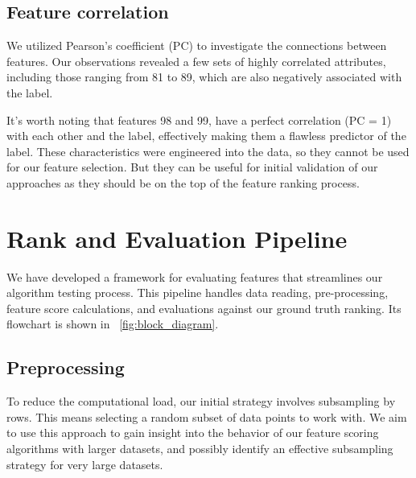 \documentclass[fleqn,moreauthors,10pt]{ds_report}
\begin{document}
\subsection*{Feature correlation}
We utilized Pearson's coefficient (PC) to investigate the connections between features. Our observations revealed a few sets of highly correlated attributes, including those ranging from 81 to 89, which are also negatively associated with the label.

It's worth noting that features 98 and 99, have a perfect correlation (PC = 1) with each other and the label, effectively making them a flawless predictor of the label. These characteristics were engineered into the data, so they cannot be used for our feature selection. But they can be useful for initial validation of our approaches as they should be on the top of the feature ranking process.

\section*{Rank and Evaluation Pipeline}

We have developed a framework for evaluating features that streamlines our algorithm testing process. This pipeline handles data reading, pre-processing, feature score calculations, and evaluations against our ground truth ranking. Its flowchart is shown in \figurename~\ref{fig:block_diagram}.


\subsection*{Preprocessing}
To reduce the computational load, our initial strategy involves subsampling by rows. This means selecting a random subset of data points to work with. We aim to use this approach to gain insight into the behavior of our feature scoring algorithms with larger datasets, and possibly identify an effective subsampling strategy for very large datasets. 
\end{document}
